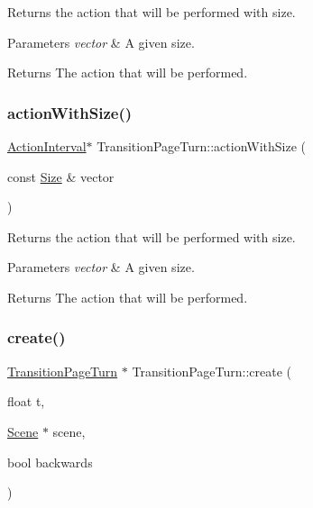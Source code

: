 Returns the action that will be performed with size.


\begin{DoxyParams}{Parameters}
{\em vector} & A given size. \\
\hline
\end{DoxyParams}
\begin{DoxyReturn}{Returns}
The action that will be performed. 
\end{DoxyReturn}
\mbox{\label{classTransitionPageTurn_acb8c14a97f74aaffa0ec7458532a3e7d}} 
\subsubsection{\texorpdfstring{action\+With\+Size()}{actionWithSize()}\hspace{0.1cm}{\footnotesize\ttfamily [2/2]}}
{\footnotesize\ttfamily \hyperlink{classActionInterval}{Action\+Interval}$\ast$ Transition\+Page\+Turn\+::action\+With\+Size (\begin{DoxyParamCaption}\item[{const \hyperlink{classSize}{Size} \&}]{vector }\end{DoxyParamCaption})}

Returns the action that will be performed with size.


\begin{DoxyParams}{Parameters}
{\em vector} & A given size. \\
\hline
\end{DoxyParams}
\begin{DoxyReturn}{Returns}
The action that will be performed. 
\end{DoxyReturn}
\mbox{\label{classTransitionPageTurn_a3e13201c0b36b7b34bc42dd9a535b0b1}} 
\subsubsection{\texorpdfstring{create()}{create()}\hspace{0.1cm}{\footnotesize\ttfamily [1/2]}}
{\footnotesize\ttfamily \hyperlink{classTransitionPageTurn}{Transition\+Page\+Turn} $\ast$ Transition\+Page\+Turn\+::create (\begin{DoxyParamCaption}\item[{float}]{t,  }\item[{\hyperlink{classScene}{Scene} $\ast$}]{scene,  }\item[{bool}]{backwards }\end{DoxyParamCaption})\hspace{0.3cm}{\ttfamily [static]}}

